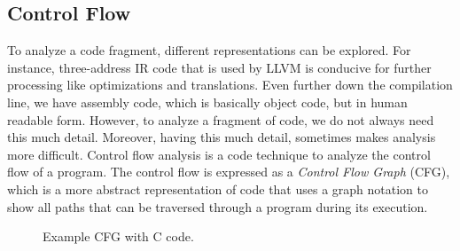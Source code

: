\subsection{Control Flow}\label{sec:control_flow_graph}
To analyze a code fragment, different representations can be explored. For instance, three-address IR code that is used by LLVM is conducive for further processing like optimizations and translations. Even further down the compilation line, we have assembly code, which is basically object code, but in human readable form. However, to analyze a fragment of code, we do not always need this much detail. Moreover, having this much detail, sometimes makes analysis more difficult. Control flow analysis is a code technique to analyze the control flow of a program. The control flow is expressed as a \emph{Control Flow Graph} (CFG), which is a more abstract representation of code that uses a graph notation to show all paths that can be traversed through a program during its execution.  

\begin{figure}[H]
\centering
{}\quad\quad
{}
\hfill
\caption{Example CFG with C code.}
\label{fig:cfg}
\end{figure}

